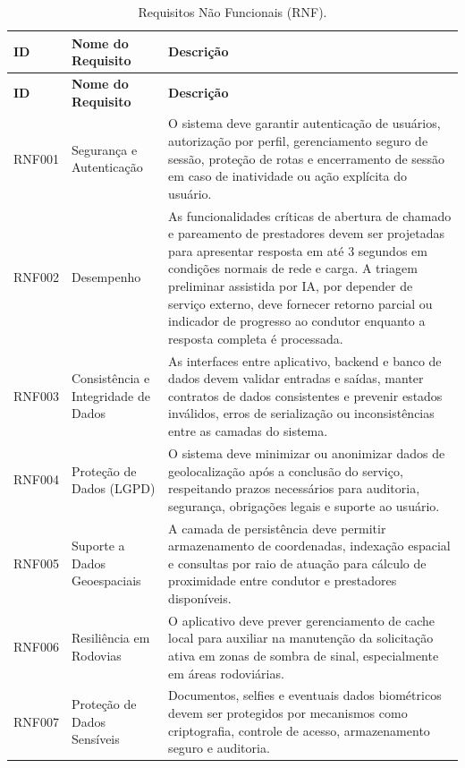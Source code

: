 \documentclass[12pt, a4paper]{article}
\begin{document}
{\footnotesize
\setlength{\tabcolsep}{3pt}
\renewcommand{\arraystretch}{1.15}
\begin{longtable}{|>{\raggedright\arraybackslash}p{}|>{\raggedright\arraybackslash}p{}|>{\raggedright\arraybackslash}p{}|}
\caption{Requisitos Não Funcionais (RNF).}
\label{tab:rnf} \\
\hline
\textbf{ID} & \textbf{Nome do Requisito} & \textbf{Descrição} \\ \hline
\endfirsthead
\hline
\textbf{ID} & \textbf{Nome do Requisito} & \textbf{Descrição} \\ \hline
\endhead
RNF001 & Segurança e Autenticação & O sistema deve garantir autenticação de usuários, autorização por perfil, gerenciamento seguro de sessão, proteção de rotas e encerramento de sessão em caso de inatividade ou ação explícita do usuário. \\ \hline
RNF002 & Desempenho & As funcionalidades críticas de abertura de chamado e pareamento de prestadores devem ser projetadas para apresentar resposta em até 3 segundos em condições normais de rede e carga. A triagem preliminar assistida por IA, por depender de serviço externo, deve fornecer retorno parcial ou indicador de progresso ao condutor enquanto a resposta completa é processada. \\ \hline
RNF003 & Consistência e Integridade de Dados & As interfaces entre aplicativo, backend e banco de dados devem validar entradas e saídas, manter contratos de dados consistentes e prevenir estados inválidos, erros de serialização ou inconsistências entre as camadas do sistema. \\ \hline
RNF004 & Proteção de Dados (LGPD) & O sistema deve minimizar ou anonimizar dados de geolocalização após a conclusão do serviço, respeitando prazos necessários para auditoria, segurança, obrigações legais e suporte ao usuário. \\ \hline
RNF005 & Suporte a Dados Geoespaciais & A camada de persistência deve permitir armazenamento de coordenadas, indexação espacial e consultas por raio de atuação para cálculo de proximidade entre condutor e prestadores disponíveis. \\ \hline
RNF006 & Resiliência em Rodovias & O aplicativo deve prever gerenciamento de cache local para auxiliar na manutenção da solicitação ativa em zonas de sombra de sinal, especialmente em áreas rodoviárias. \\ \hline
RNF007 & Proteção de Dados Sensíveis & Documentos, selfies e eventuais dados biométricos devem ser protegidos por mecanismos como criptografia, controle de acesso, armazenamento seguro e auditoria. \\ \hline

\end{longtable}}
\end{document}
